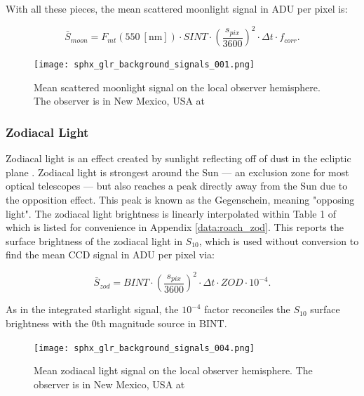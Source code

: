 With all these pieces, the mean scattered moonlight signal in ADU per pixel is:

\begin{equation} \label{eq:moonlight_adu}
  \bar{S}_{moon} = F_{mt}(550 \: \left[\textrm{nm}\right]) \cdot SINT \cdot \left( \frac{s_{pix}}{3600} \right)^2 \cdot \Delta t \cdot f_{corr}.
\end{equation}

\begin{figure}[ht]
  \centering
  \texttt{[image: sphx\_glr\_background\_signals\_001.png]}
  \caption{Mean scattered moonlight signal on the local observer hemisphere. The observer is in New Mexico, USA at
  \pogslla}
  \label{fig:moonlight_hemi}
\end{figure}

\subsubsection{Zodiacal Light}

Zodiacal light is an effect created by sunlight reflecting off of dust in the ecliptic plane \cite{krag2003}. Zodiacal light is strongest around the Sun --- an exclusion zone for most optical telescopes --- but also reaches a peak directly away from the Sun due to the opposition effect. This peak is known as the Gegenschein, meaning "opposing light". The zodiacal light brightness is linearly interpolated within Table 1 of \cite{roach1972} which is listed for convenience in Appendix \ref{data:roach_zod}. This reports the surface brightness of the zodiacal light in $S_{10}$, which is used without conversion to find the mean CCD signal in ADU per pixel via:

\begin{equation} \label{eq:zodiacal_adu}
  \bar{S}_{zod} = BINT \cdot \left( \frac{s_{pix}}{3600} \right)^2 \cdot \Delta t \cdot ZOD \cdot 10^{-4}.
\end{equation}

As in the integrated starlight signal, the $10^{-4}$ factor reconciles the $S_{10}$ surface brightness with the 0th magnitude source in $\textrm{BINT}$. 

\begin{figure}[ht]
  \centering
  \texttt{[image: sphx\_glr\_background\_signals\_004.png]}
  \caption{Mean zodiacal light signal on the local observer hemisphere. The observer is in New Mexico, USA at
  \pogslla}
  \label{fig:zod_hemi}
\end{figure}

